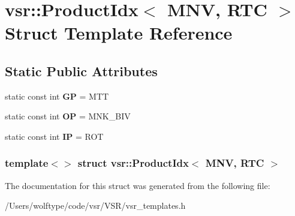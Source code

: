 \hypertarget{structvsr_1_1_product_idx_3_01_m_n_v_00_01_r_t_c_01_4}{\section{vsr\-:\-:Product\-Idx$<$ M\-N\-V, R\-T\-C $>$ Struct Template Reference}
\label{structvsr_1_1_product_idx_3_01_m_n_v_00_01_r_t_c_01_4}
}
\subsection*{Static Public Attributes}
\begin{DoxyCompactItemize}
\item 
\hypertarget{structvsr_1_1_product_idx_3_01_m_n_v_00_01_r_t_c_01_4_aef9fc922ed881a6634f22469cd0c498d}{static const int {\bfseries G\-P} = M\-T\-T}\label{structvsr_1_1_product_idx_3_01_m_n_v_00_01_r_t_c_01_4_aef9fc922ed881a6634f22469cd0c498d}

\item 
\hypertarget{structvsr_1_1_product_idx_3_01_m_n_v_00_01_r_t_c_01_4_a54d26b28ffa0776ec5ab33a7d23aa1d1}{static const int {\bfseries O\-P} = M\-N\-K\-\_\-\-B\-I\-V}\label{structvsr_1_1_product_idx_3_01_m_n_v_00_01_r_t_c_01_4_a54d26b28ffa0776ec5ab33a7d23aa1d1}

\item 
\hypertarget{structvsr_1_1_product_idx_3_01_m_n_v_00_01_r_t_c_01_4_af400334bd4ea340dc911881dca721df5}{static const int {\bfseries I\-P} = R\-O\-T}\label{structvsr_1_1_product_idx_3_01_m_n_v_00_01_r_t_c_01_4_af400334bd4ea340dc911881dca721df5}

\end{DoxyCompactItemize}
\subsubsection*{template$<$$>$ struct vsr\-::\-Product\-Idx$<$ M\-N\-V, R\-T\-C $>$}



The documentation for this struct was generated from the following file\-:\begin{DoxyCompactItemize}
\item 
/\-Users/wolftype/code/vsr/\-V\-S\-R/vsr\-\_\-templates.\-h\end{DoxyCompactItemize}

